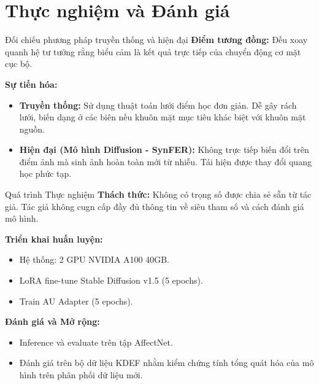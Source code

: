 \section{Thực nghiệm và Đánh giá}
\begin{frame}{Đối chiếu phương pháp truyền thống và hiện đại}
    \textbf{Điểm tương đồng:} Đều xoay quanh hệ tư tưởng rằng biểu cảm là kết quả trực tiếp của chuyển động cơ mặt cục bộ.
    \vspace{0.3cm}

    \textbf{Sự tiến hóa:}
    \begin{itemize}
        \item \textbf{Truyền thống:} Sử dụng thuật toán lưới điểm học đơn giản. Dễ gây rách lưới, biến dạng ở các biên nếu khuôn mặt mục tiêu khác biệt với khuôn mặt nguồn.
        \item \textbf{Hiện đại (Mô hình Diffusion - SynFER):} Không trực tiếp biến đổi trên điểm ảnh mà sinh ảnh hoàn toàn mới từ nhiễu. Tái hiện được thay đổi quang học phức tạp.
    \end{itemize}
\end{frame}

\begin{frame}{Quá trình Thực nghiệm}
    \textbf{Thách thức:} Không có trọng số được chia sẻ sẵn từ tác giả. Tác giả không cugn cấp đầy đủ thông tin về siêu tham số và cách đánh giá mô hình.
    \vspace{0.3cm}

    \textbf{Triển khai huấn luyện:}
    \begin{itemize}
        \item Hệ thống: 2 GPU NVIDIA A100 40GB.
        \item LoRA fine-tune Stable Diffusion v1.5 (5 epochs).
        \item Train AU Adapter (5 epochs).
    \end{itemize}
    \vspace{0.3cm}

    \textbf{Đánh giá và Mở rộng:}
    \begin{itemize}
        \item Inference và evaluate trên tập AffectNet.
        \item Đánh giá trên bộ dữ liệu KDEF nhằm kiểm chứng tính tổng quát hóa của mô hình trên phân phối dữ liệu mới.
    \end{itemize}
\end{frame}

